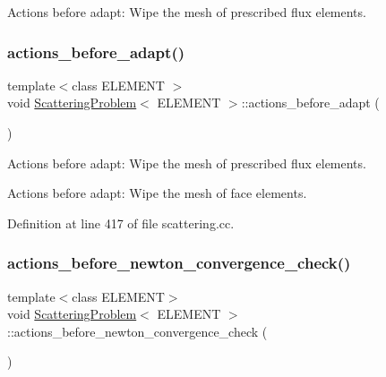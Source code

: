 Actions before adapt\+: Wipe the mesh of prescribed flux elements. 

\mbox{\label{classScatteringProblem_aca1b756a307f9c1d8a70c7b7e68a296b}} 
\subsubsection{\texorpdfstring{actions\+\_\+before\+\_\+adapt()}{actions\_before\_adapt()}\hspace{0.1cm}{\footnotesize\ttfamily [2/2]}}
{\footnotesize\ttfamily template$<$class E\+L\+E\+M\+E\+NT $>$ \\
void \hyperlink{classScatteringProblem}{Scattering\+Problem}$<$ E\+L\+E\+M\+E\+NT $>$\+::actions\+\_\+before\+\_\+adapt (\begin{DoxyParamCaption}{ }\end{DoxyParamCaption})}



Actions before adapt\+: Wipe the mesh of prescribed flux elements. 

Actions before adapt\+: Wipe the mesh of face elements. 

Definition at line 417 of file scattering.\+cc.

\mbox{\label{classScatteringProblem_ad096c311ee474d23514656d2ba76a4b8}} 
\subsubsection{\texorpdfstring{actions\+\_\+before\+\_\+newton\+\_\+convergence\+\_\+check()}{actions\_before\_newton\_convergence\_check()}\hspace{0.1cm}{\footnotesize\ttfamily [1/2]}}
{\footnotesize\ttfamily template$<$class E\+L\+E\+M\+E\+NT$>$ \\
void \hyperlink{classScatteringProblem}{Scattering\+Problem}$<$ E\+L\+E\+M\+E\+NT $>$\+::actions\+\_\+before\+\_\+newton\+\_\+convergence\+\_\+check (\begin{DoxyParamCaption}{ }\end{DoxyParamCaption})\hspace{0.3cm}{\ttfamily [inline]}}



